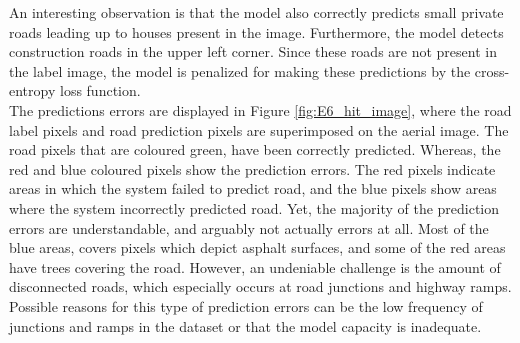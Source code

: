 An interesting observation is that the model also correctly predicts small private roads leading up to houses present in the image. Furthermore, the model detects construction roads in the upper left corner. Since these roads are not present in the label image, the model is penalized for making these predictions by the cross-entropy loss function.\\

The predictions errors are displayed in Figure \ref{fig:E6_hit_image}, where the road label pixels and road prediction pixels are superimposed on the aerial image. The road pixels that are coloured green, have been correctly predicted. Whereas, the red and blue coloured pixels show the prediction errors. The red pixels indicate areas in which the system failed to predict road, and the blue pixels show areas where the system incorrectly predicted road. Yet, the majority of the prediction errors are understandable, and arguably not actually errors at all. Most of the blue areas, covers pixels which depict asphalt surfaces, and some of the red areas have trees covering the road. However, an undeniable challenge is the amount of disconnected roads, which especially occurs at road junctions and highway ramps. Possible reasons for this type of prediction errors can be the low frequency of junctions and ramps in the dataset or that the model capacity is inadequate. \\



